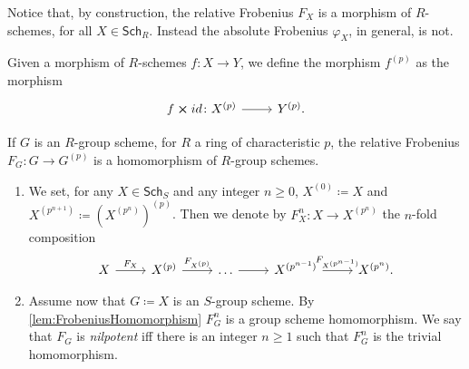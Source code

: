\documentclass[../Main]{subfiles}
\begin{document}
\begin{rem}[]
	Notice that, by construction, the relative Frobenius $F_X$ is a
	morphism of $R$-schemes, for all $X \in \mathsf{Sch}_{ R }$.
	Instead the absolute Frobenius $\varphi_X$, in general, is not.
\end{rem}


\begin{defn}[Notation]
	Given a morphism of $R$-schemes $f\colon X \to Y$,
	we define the morphism $f^{(p)}$ as the morphism
	\begin{equation}
	\begin{tikzcd}[row sep = 0ex
		,/tikz/column 1/.append style={anchor=base east}
		,/tikz/column 2/.append style={anchor=base west}]
		f \cross id\colon X^{(p)} \arrow[r, "", rightarrow] &
		Y^{(p)}
	.\end{tikzcd}
	\end{equation} 
\end{defn}


\begin{lem}\label{lem:FrobeniusHomomorphism}
	If $G$ is an $R$-group scheme, for $R$ a ring of characteristic $p$,
	the relative Frobenius $F_G\colon G \to G^{(p)}$ is a 
	homomorphism of $R$-group schemes.
\end{lem} 


\begin{defn}\leavevmode\vspace{-1.2\baselineskip}
\begin{enumerate}
\item We set, for any $X \in \mathsf{Sch}_{ S }$ and any integer $n \geq 0$,
	$X^{(0)} \coloneqq X$ and $X^{(p^{n+1})} \coloneqq \left( X^{(p^{n})} \right)^{(p)}$.
	Then we denote by $F^n_X\colon X \to X^{(p^n)}$
	the $n$-fold composition
	\begin{equation}
	\begin{tikzcd}
		X \arrow[r, "F_X", rightarrow] &
		X^{(p)} \arrow[r, "F_{X^{(p)}}", rightarrow] &
		\ldots \arrow[r, "", rightarrow] &
		X^{(p^{n-1})} \arrow[r, "F_{X^{(p^{n-1})}}", rightarrow] &
		X^{(p^n)}
	.\end{tikzcd}
	\end{equation}
\item Assume now that $G \coloneqq X$ is an $S$-group scheme. 
	By \cref{lem:FrobeniusHomomorphism} $F^n_G$ is a group scheme homomorphism.
	We say that $F_G$ is {\em nilpotent} iff there is an integer $n \geq 1$ such that
	$F^n_G$ is the trivial homomorphism.
\end{enumerate}
\end{defn}
\end{document}
